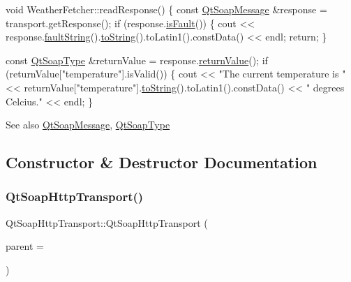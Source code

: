 \begin{DoxyCode}
\textcolor{keywordtype}{void} WeatherFetcher::readResponse()
\{
    \textcolor{keyword}{const} \mbox{\hyperlink{class_qt_soap_message}{QtSoapMessage}} &response = transport.getResponse();
    \textcolor{keywordflow}{if} (response.\mbox{\hyperlink{class_qt_soap_message_a7aa7a55d9f593144499f8622e8aa1ce5}{isFault}}()) \{
        cout << response.\mbox{\hyperlink{class_qt_soap_message_a11b95f781994094c764e457f800a3a21}{faultString}}().\mbox{\hyperlink{class_qt_soap_type_a253d268332ea0b2ebba6ee52522fa685}{toString}}().toLatin1().constData() << endl;
        \textcolor{keywordflow}{return};
    \}

    \textcolor{keyword}{const} \mbox{\hyperlink{class_qt_soap_type}{QtSoapType}} &returnValue = response.\mbox{\hyperlink{class_qt_soap_message_ac223f69e31d5f9ff251a467149c547d5}{returnValue}}();
    \textcolor{keywordflow}{if} (returnValue[\textcolor{stringliteral}{"temperature"}].isValid()) \{
    cout << \textcolor{stringliteral}{"The current temperature is "}
         << returnValue[\textcolor{stringliteral}{"temperature"}].\mbox{\hyperlink{class_qt_soap_type_a253d268332ea0b2ebba6ee52522fa685}{toString}}().toLatin1().constData()
         << \textcolor{stringliteral}{" degrees Celcius."} << endl;
\}
\end{DoxyCode}


\begin{DoxySeeAlso}{See also}
\mbox{\hyperlink{class_qt_soap_message}{Qt\+Soap\+Message}}, \mbox{\hyperlink{class_qt_soap_type}{Qt\+Soap\+Type}} 
\end{DoxySeeAlso}


\subsection{Constructor \& Destructor Documentation}
\mbox{\label{class_qt_soap_http_transport_a74fc050fd6d7914dfe444af3faf16334}} 
\subsubsection{\texorpdfstring{Qt\+Soap\+Http\+Transport()}{QtSoapHttpTransport()}}
{\footnotesize\ttfamily Qt\+Soap\+Http\+Transport\+::\+Qt\+Soap\+Http\+Transport (\begin{DoxyParamCaption}\item[{Q\+Object $\ast$}]{parent = {} }\end{DoxyParamCaption})}

